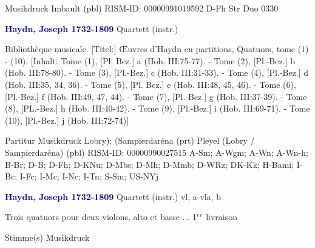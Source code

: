 \documentclass[twocolumn]{book}
\begin{document}
\newline Musikdruck
\newline Imbault  (pbl)
\newline RISM-ID: 00000991019592
\newline D-Fh  Str Duo 0330
\newline \par \vspace{7pt} \textcolor{darkblue}{\textbf{Haydn, Joseph  1732-1809}}
\newline Quartett (instr.)
\newline \begin{itshape}[Umschlagtitel:] Bibliothèque musicale. [Titel:] Œuvres d'Haydn en partitions, Quatuors, tome (1) - (10). [Inhalt: Tome (1), [Pl. Bez.] a (Hob. III:75-77). - Tome (2), [Pl.-Bez.] b (Hob. III:78-80). - Tome (3), [Pl.-Bez.] c (Hob. III:31-33). - Tome (4), [Pl.-Bez.] d (Hob. III:35, 34, 36). - Tome (5), [Pl. Bez.] e (Hob. III:48, 45, 46). - Tome (6), [Pl.-Bez.] f (Hob. III:49, 47, 44). - Tome (7), [Pl.-Bez.] g (Hob. III:37-39). - Tome (8), [PL.-Bez.] h (Hob. III:40-42). - Tome (9), [Pl.-Bez.] i (Hob. III:69-71). - Tome (10), [Pl.-Bez.] j (Hob. III:72-74)]\end{itshape} 
\newline \textcolor{darkblue}{}  Partitur
\newline Musikdruck
\newline Lobry); (Sampierdaréna  (prt)
\newline Pleyel (Lobry / Sampierdaréna)  (pbl)
\newline RISM-ID: 00000990027515
\newline A-Sm; A-Wgm; A-Wn; A-Wn-h; B-Br; D-B; D-Fh; D-KNu; D-Mbs; D-Mh; D-Mmb; D-WRz; DK-Kk; H-Bami; I-Bc; I-Fc; I-Mc; I-Nc; I-Tn; S-Sm; US-NYj
\newline \par \vspace{7pt} \textcolor{darkblue}{\textbf{Haydn, Joseph  1732-1809}}
\newline Quartett (instr.)
 vl, a-vla, b
\newline \begin{itshape}Trois quatuors pour deux violons, alto et basse ... 1$^r$$^e$ livraison\end{itshape} 
\newline \textcolor{darkblue}{}  Stimme(s)
\newline Musikdruck
\end{document}
